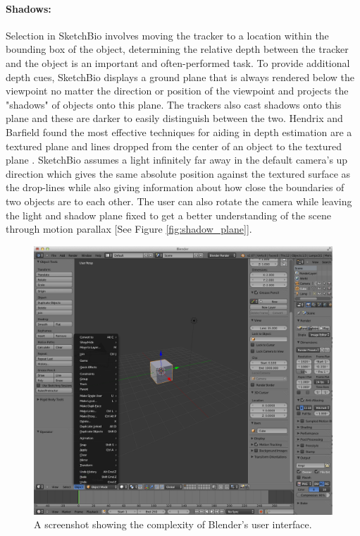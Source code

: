 \documentclass[twocolumn]{bmcart}%
\begin{document}
\paragraph*{Shadows:}
Selection in SketchBio involves moving the tracker to a location within the bounding box of the object, determining the relative depth between the tracker and the object is an important and often-performed task.  To provide additional depth cues, SketchBio displays a ground plane that is always rendered below the viewpoint no matter the direction or position of the viewpoint and projects the "shadows" of objects onto this plane.  The trackers also cast shadows onto this plane and these are darker to easily distinguish between the two.  Hendrix and Barfield found the most effective techniques for aiding in depth estimation are a textured plane and lines dropped from the center of an object to the textured plane \cite{Hendrix1995103}.  SketchBio assumes a light infinitely far away in the default camera's up direction which gives the same absolute position against the textured surface as the drop-lines while also giving information about how close the boundaries of two objects are to each other.  The user can also rotate the camera while leaving the light and shadow plane fixed to get a better understanding of the scene through motion parallax [See Figure \ref{fig:shadow_plane}].

\begin{figure}[h]
\centering
\includegraphics[width=0.8\columnwidth]{blender_interface.png}
\caption{A screenshot showing the complexity of Blender's user interface.}
\label{fig:blender_interface}
\end{figure}
\end{document}
